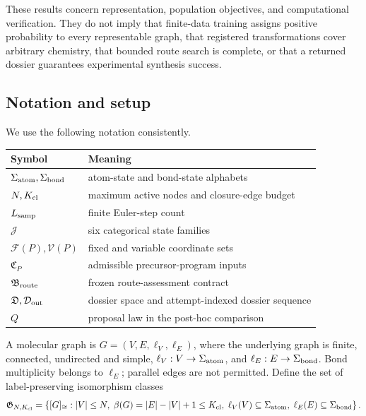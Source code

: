 \documentclass{article}
\begin{document}
These results concern representation, population objectives, and computational verification.
They do not imply that finite-data training assigns positive probability to every representable
graph, that registered transformations cover arbitrary chemistry, that bounded route search is
complete, or that a returned dossier guarantees experimental synthesis success.

\subsection{Notation and setup}

We use the following notation consistently.
\begin{center}
\small
\begin{tabular}{@{}ll@{}}
\toprule
Symbol & Meaning \\
\midrule
$\Sigma_{\rm atom},\Sigma_{\rm bond}$ & atom-state and bond-state alphabets \\
$N,K_{\rm cl}$ & maximum active nodes and closure-edge budget \\
$L_{\rm samp}$ & finite Euler-step count \\
$\mathscr J$ & six categorical state families \\
$\mathcal F(P),\mathcal V(P)$ & fixed and variable coordinate sets \\
$\mathfrak C_P$ & admissible precursor-program inputs \\
$\mathfrak B_{\rm route}$ & frozen route-assessment contract \\
$\mathfrak D,\mathcal D_{\rm out}$ & dossier space and attempt-indexed dossier sequence \\
$Q$ & proposal law in the post-hoc comparison \\
\bottomrule
\end{tabular}
\end{center}

A molecular graph is $G=(V,E,\ell_V,\ell_E)$, where the underlying graph is finite, connected,
undirected and simple, $\ell_V:V\to\Sigma_{\rm atom}$, and
$\ell_E:E\to\Sigma_{\rm bond}$. Bond multiplicity belongs to $\ell_E$; parallel edges are not
permitted. Define the set of label-preserving isomorphism classes
\begin{equation}
    \mathfrak{G}_{N,K_{\rm cl}}
    =
    \left\{
        [G]_{\cong}:
        |V|\leq N,\;
        \beta(G)=|E|-|V|+1\leq K_{\rm cl},\;
        \ell_V(V)\subseteq\Sigma_{\rm atom},\;
        \ell_E(E)\subseteq\Sigma_{\rm bond}
    \right\}.
\end{equation}
\end{document}

